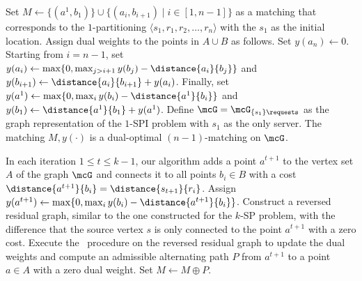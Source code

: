 Set $M\leftarrow \{(a^1, b_1)\}\cup \{(a_i, b_{i+1})\mid i\in[1, n-1]\}$ as a matching that corresponds to the $1$-partitioning $\langle s_1, r_1, r_2,\ldots, r_n\rangle$ with the $s_1$ as the initial location. Assign dual weights to the points in $A\cup B$ as follows. Set $y(a_n)\leftarrow 0$. Starting from $i=n-1$, set $y(a_{i})\leftarrow\max\{0, \max_{j>i+1}y(b_j)-\distance{a_{i}}{b_j}\}$ and $y(b_{i+1})\leftarrow\distance{a_{i}}{b_{i+1}} + y(a_{i})$. Finally, set $y(a^{1})\leftarrow\max\{0, \max_{i}y(b_i)-\distance{a^{1}}{b_i}\}$ and $y(b_1)\leftarrow \distance{a^{1}}{b_{1}} + y(a^{1})$. Define $\mcG=\mcG_{\{s_1\}\requests}$ as the graph representation of the $1$-SPI problem with $s_1$ as the only server. The matching $M, y(\cdot)$ is a dual-optimal $(n-1)$-matching on $\mcG$.

In each iteration $1\le t\le k-1$, our algorithm adds a point $a^{t+1}$ to the vertex set $A$ of the graph $\mcG$ and connects it to all points $b_i\in B$ with a cost $\distance{a^{t+1}}{b_i} = \distance{s_{t+1}}{r_i}$. Assign $y(a^{t+1})\leftarrow\max\{0, \max_{i}y(b_i)-\distance{a^{t+1}}{b_i}\}$. Construct a reversed residual graph, similar to the one constructed for the $k$-SP problem, with the difference that the source vertex $s$ is only connected to the point $a^{t+1}$ with a zero cost. Execute the \reverse\ procedure on the reversed residual graph to update the dual weights and compute an admissible alternating path $P$ from $a^{t+1}$ to a point $a\in A$ with a zero dual weight. Set $M\leftarrow M\oplus P$.









